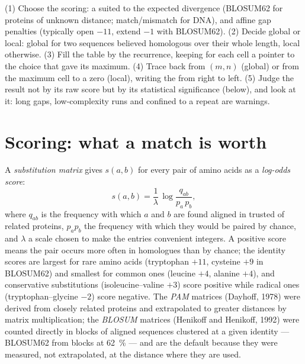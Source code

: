 \begin{method}\label{met:b3:bioinformatics:align}
(1) Choose the scoring: a  suited to the expected
divergence (BLOSUM62 for proteins of unknown distance; match/mismatch
for DNA), and affine gap penalties (typically open $-11$, extend $-1$
with BLOSUM62). (2) Decide global or local: global for two sequences
believed homologous over their whole length, local otherwise.
(3) Fill the table by the recurrence, keeping for each cell a pointer
to the choice that gave its maximum. (4) Trace back from $(m,n)$
(global) or from the maximum cell to a zero (local), writing the
 from right to left. (5) Judge the result not by its raw
score but by its statistical significance (below), and look at it:
long gaps, low-complexity runs and  confined to a repeat are
warnings.
\end{method}

\section{Scoring: what a match is worth}

\begin{definition}\label{def:b3:bioinformatics:matrices}
A \emph{substitution matrix} gives $s(a,b)$ for every pair of amino
acids as a \emph{log-odds score}:
\[
s(a,b) = \frac{1}{\lambda}\,\log\frac{q_{ab}}{p_{a}\,p_{b}},
\]
where $q_{ab}$ is the frequency with which $a$ and $b$ are found
aligned in trusted  of related proteins, $p_{a} p_{b}$ the
frequency with which they would be paired by chance, and $\lambda$ a
scale chosen to make the entries convenient integers. A positive score
means the pair occurs more often in homologues than by chance; the
identity scores are largest for rare amino acids (tryptophan $+11$,
cysteine $+9$ in BLOSUM62) and smallest for common ones (leucine $+4$,
alanine $+4$), and conservative substitutions (isoleucine--valine $+3$)
score positive while radical ones (tryptophan--glycine $-2$) score
negative. The \emph{PAM} matrices (Dayhoff, 1978) were derived from
closely related proteins and extrapolated to greater distances by
matrix multiplication; the \emph{BLOSUM} matrices (Henikoff and
Henikoff, 1992) were counted directly in blocks of aligned sequences
clustered at a given identity --- BLOSUM62 from blocks at \qty{62}{\%}
--- and are the default because they were measured, not extrapolated,
at the distance where they are used.
\end{definition}


